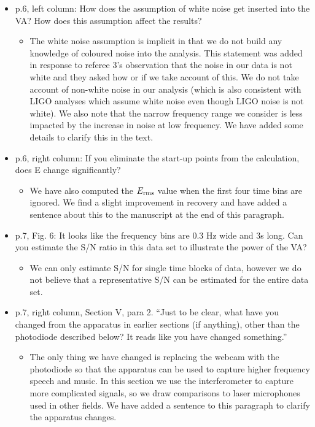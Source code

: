 \documentclass[a4paper, 10pt]{letter}
\begin{document}
\begin{itemize}
\item p.6, left column: How does the assumption of white noise get inserted into the VA? How does this assumption affect the results?
\begin{itemize}
\item The white noise assumption is implicit in that we do not build any knowledge of coloured noise into the analysis. This statement was added in response to referee 3's observation that the noise in our data is not white and they asked how or if we take account of this. We do not take account of non-white noise in our analysis (which is also consistent with LIGO analyses which assume white noise even though LIGO noise is not white). We also note that the narrow frequency range we consider is less impacted by the increase in noise at low frequency. We have added some details to clarify this in the text. 
\end{itemize}

\item p.6, right column: If you eliminate the start-up points from the calculation, does E change significantly?
\begin{itemize}
\item We have also computed the $E_{\rm rms}$ value when the first four time bins are ignored. We find a slight improvement in recovery and have added a sentence about this to the manuscript at the end of this paragraph. 
\end{itemize}

\item p.7, Fig. 6: It looks like the frequency bins are 0.3 Hz wide and 3s long. Can you estimate the S/N ratio in this data set to illustrate the power of the VA?
\begin{itemize}
\item We can only estimate S/N for single time blocks of data, however we do not believe that a representative S/N can be estimated for the entire data set. 
\end{itemize}

\item p.7, right column, Section V, para 2. ``Just to be clear, what have you changed from the apparatus in earlier sections (if anything), other than the photodiode described below? It reads like you have changed something.''
\begin{itemize}
\item The only thing we have changed is replacing the webcam with the photodiode so that the apparatus can be used to capture higher frequency speech and music. In this section we use the interferometer to capture more complicated signals, so we draw comparisons to laser microphones used in other fields. We have added a sentence to this paragraph to clarify the apparatus changes. 
\end{itemize}


\end{itemize}
\end{document}
